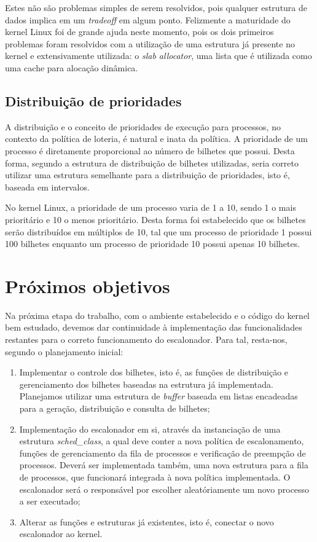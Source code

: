 \documentclass[a4paper,12pt]{article}
\begin{document}
Estes não são problemas simples de serem resolvidos, pois qualquer estrutura de dados implica em um \emph{tradeoff} em algum ponto. Felizmente a maturidade do kernel Linux foi de grande ajuda neste momento, pois os dois primeiros problemas foram resolvidos com a utilização de uma estrutura já presente no kernel e extensivamente utilizada: o \emph{slab allocator}, uma lista que é utilizada como uma cache para alocação dinâmica.

\subsection{Distribuição de prioridades}
A distribuição e o conceito de prioridades de execução para processos, no contexto da política de loteria, é natural e inata da política. A prioridade de um processo é diretamente proporcional ao número de bilhetes que possui. Desta forma, segundo a estrutura de distribuição de bilhetes utilizadas, seria correto utilizar uma estrutura semelhante para a distribuição de prioridades, isto é, baseada em intervalos.

No kernel Linux, a prioridade de um processo varia de 1 a 10, sendo 1 o mais prioritário e 10 o menos prioritário. Desta forma foi estabelecido que os bilhetes serão distribuídos em múltiplos de 10, tal que um processo de prioridade 1 possui 100 bilhetes enquanto um processo de prioridade 10 possui apenas 10 bilhetes.


\section{Próximos objetivos}
Na próxima etapa do trabalho, com o ambiente estabelecido e o código do kernel bem estudado, devemos dar continuidade à implementação das funcionalidades restantes para o correto funcionamento do escalonador. Para tal, resta-nos, segundo o planejamento inicial:

\begin{enumerate}
  \item Implementar o controle dos bilhetes, isto é, as funções de distribuição e gerenciamento dos bilhetes baseadas na estrutura já implementada. Planejamos utilizar uma estrutura de \emph{buffer} baseada em listas encadeadas para a geração, distribuição e consulta de bilhetes;
  \item Implementação do escalonador em si, através da instanciação de uma estrutura \emph{sched\_class}, a qual deve conter a nova política de escalonamento, funções de gerenciamento da fila de processos e verificação de preempção de processos. Deverá ser implementada também, uma nova estrutura para a fila de processos, que funcionará integrada à nova política implementada. O escalonador será o responsável por escolher aleatóriamente um novo processo a ser executado;
  \item Alterar as funções e estruturas já existentes, isto é, conectar o novo escalonador ao kernel.
\end{enumerate}
\end{document}
